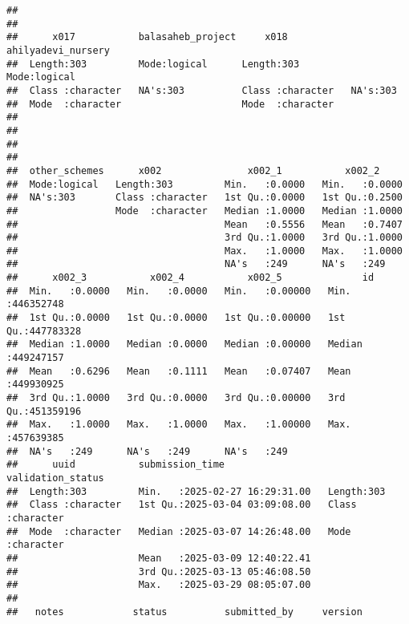 \documentclass[
]{article}
\begin{document}
\begin{verbatim}
##                                                                       
##                                                                       
##      x017           balasaheb_project     x018           ahilyadevi_nursery
##  Length:303         Mode:logical      Length:303         Mode:logical      
##  Class :character   NA's:303          Class :character   NA's:303          
##  Mode  :character                     Mode  :character                     
##                                                                            
##                                                                            
##                                                                            
##                                                                            
##  other_schemes      x002               x002_1           x002_2      
##  Mode:logical   Length:303         Min.   :0.0000   Min.   :0.0000  
##  NA's:303       Class :character   1st Qu.:0.0000   1st Qu.:0.2500  
##                 Mode  :character   Median :1.0000   Median :1.0000  
##                                    Mean   :0.5556   Mean   :0.7407  
##                                    3rd Qu.:1.0000   3rd Qu.:1.0000  
##                                    Max.   :1.0000   Max.   :1.0000  
##                                    NA's   :249      NA's   :249     
##      x002_3           x002_4           x002_5              id           
##  Min.   :0.0000   Min.   :0.0000   Min.   :0.00000   Min.   :446352748  
##  1st Qu.:0.0000   1st Qu.:0.0000   1st Qu.:0.00000   1st Qu.:447783328  
##  Median :1.0000   Median :0.0000   Median :0.00000   Median :449247157  
##  Mean   :0.6296   Mean   :0.1111   Mean   :0.07407   Mean   :449930925  
##  3rd Qu.:1.0000   3rd Qu.:0.0000   3rd Qu.:0.00000   3rd Qu.:451359196  
##  Max.   :1.0000   Max.   :1.0000   Max.   :1.00000   Max.   :457639385  
##  NA's   :249      NA's   :249      NA's   :249                          
##      uuid           submission_time                  validation_status 
##  Length:303         Min.   :2025-02-27 16:29:31.00   Length:303        
##  Class :character   1st Qu.:2025-03-04 03:09:08.00   Class :character  
##  Mode  :character   Median :2025-03-07 14:26:48.00   Mode  :character  
##                     Mean   :2025-03-09 12:40:22.41                     
##                     3rd Qu.:2025-03-13 05:46:08.50                     
##                     Max.   :2025-03-29 08:05:07.00                     
##                                                                        
##   notes            status          submitted_by     version         

\end{verbatim}
\end{document}
